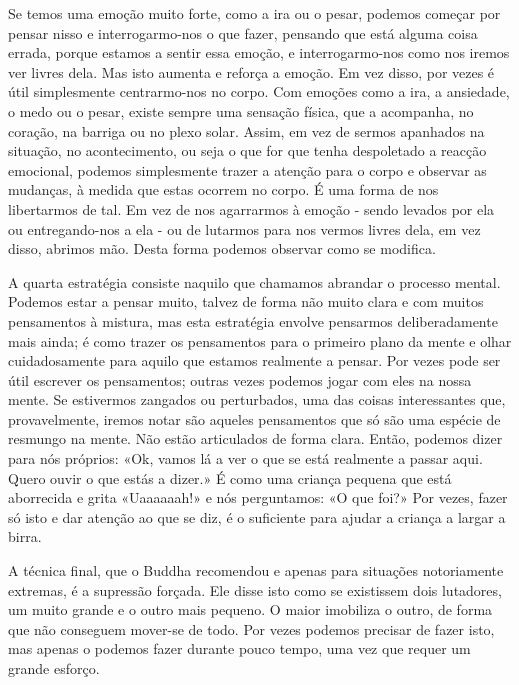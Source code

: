 Se temos uma emoção muito forte, como a ira ou o pesar, podemos começar
por pensar nisso e interrogarmo-nos o que fazer, pensando que está
alguma coisa errada, porque estamos a sentir essa emoção, e
interrogarmo-nos como nos iremos ver livres dela. Mas isto aumenta e
reforça a emoção. Em vez disso, por vezes é útil simplesmente
centrarmo-nos no corpo. Com emoções como a ira, a ansiedade, o medo ou o
pesar, existe sempre uma sensação física, que a acompanha, no coração,
na barriga ou no plexo solar. Assim, em vez de sermos apanhados na
situação, no acontecimento, ou seja o que for que tenha despoletado a
reacção emocional, podemos simplesmente trazer a atenção para o corpo e
observar as mudanças, à medida que estas ocorrem no corpo. É uma forma
de nos libertarmos de tal. Em vez de nos agarrarmos à emoção - sendo
levados por ela ou entregando-nos a ela - ou de lutarmos para nos vermos
livres dela, em vez disso, abrimos mão. Desta forma podemos observar
como se modifica.

A quarta estratégia consiste naquilo que chamamos abrandar o processo
mental. Podemos estar a pensar muito, talvez de forma não muito clara e
com muitos pensamentos à mistura, mas esta estratégia envolve pensarmos
deliberadamente mais ainda; é como trazer os pensamentos para o primeiro
plano da mente e olhar cuidadosamente para aquilo que estamos realmente
a pensar. Por vezes pode ser útil escrever os pensamentos; outras vezes
podemos jogar com eles na nossa mente. Se estivermos zangados ou
perturbados, uma das coisas interessantes que, provavelmente, iremos
notar são aqueles pensamentos que só são uma espécie de resmungo na
mente. Não estão articulados de forma clara. Então, podemos dizer para
nós próprios: «Ok, vamos lá a ver o que se está realmente a passar aqui.
Quero ouvir o que estás a dizer.» É como uma criança pequena que está
aborrecida e grita «Uaaaaaah!» e nós perguntamos: «O que foi?» Por
vezes, fazer só isto e dar atenção ao que se diz, é o suficiente para
ajudar a criança a largar a birra.

A técnica final, que o Buddha recomendou e apenas para situações
notoriamente extremas, é a supressão forçada. Ele disse isto como se
existissem dois lutadores, um muito grande e o outro mais pequeno. O
maior imobiliza o outro, de forma que não conseguem mover-se de todo.
Por vezes podemos precisar de fazer isto, mas apenas o podemos fazer
durante pouco tempo, uma vez que requer um grande esforço.


